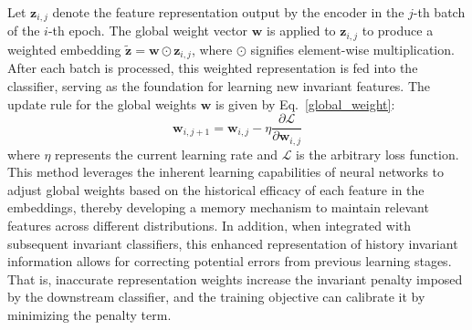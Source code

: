 Let $\mathbf{z}_{i,j}$ denote the feature representation output by the encoder in the $j$-th batch of the $i$-th epoch. The global weight vector $\mathbf{w}$ is applied to $\mathbf{z}_{i,j}$ to produce a weighted embedding $\tilde{\mathbf{z}} = \mathbf{w} \odot \mathbf{z}_{i,j}$, where $\odot$ signifies element-wise multiplication. After each batch is processed, this weighted representation is fed into the classifier, serving as the foundation for learning new invariant features. The update rule for the global weights $\mathbf{w}$ is given by Eq.~\ref{global_weight}:
\begin{equation}
\label{global_weight}
\mathbf{w}_{i,j+1}=\mathbf{w}_{i,j}-\eta \frac{\partial \mathcal{L}}{\partial \mathbf{w}_{i,j}}
\end{equation}
where $\eta$ represents the current learning rate and $\mathcal{L}$ is the arbitrary loss function. This method leverages the inherent learning capabilities of neural networks to adjust global weights based on the historical efficacy of each feature in the embeddings, thereby developing a memory mechanism to maintain relevant features across different distributions. In addition, when integrated with subsequent invariant classifiers, this enhanced representation of history invariant information allows for correcting potential errors from previous learning stages. That is, inaccurate representation weights increase the invariant penalty imposed by the downstream classifier, and the training objective can calibrate it by minimizing the penalty term.

